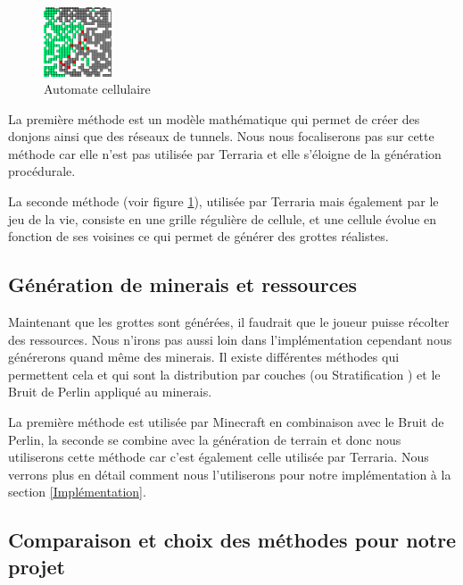 \documentclass[12pt]{article}
\begin{document}
\begin{figure}
  \centering
  \includegraphics[width=0.18\textwidth]{assets/automate_cellulaire.png}
  \caption{Automate cellulaire}
  \label{automate_cellulaire}
  \vspace{0.5cm}
\end{figure}



La première méthode est un modèle mathématique qui permet de créer des donjons ainsi que des réseaux de tunnels. Nous nous focaliserons pas sur cette méthode car elle n'est pas utilisée par Terraria et elle s'éloigne de la génération procédurale.\par 
La seconde méthode (voir figure \ref{automate_cellulaire}), utilisée par Terraria mais également par le jeu de la vie, consiste en une grille régulière de cellule, et une cellule évolue en fonction de ses voisines ce qui permet de générer des grottes réalistes.
\par
\vspace{2.5cm}
\subsection{Génération de minerais et ressources}
Maintenant que les grottes sont générées, il faudrait que le joueur puisse récolter des ressources. Nous n'irons pas aussi loin dans l'implémentation cependant nous générerons quand même des minerais. Il existe différentes méthodes qui permettent cela et qui sont la distribution par couches (ou Stratification \cite{stratification}) et le Bruit de Perlin appliqué au minerais. \par
La première méthode est utilisée par Minecraft en combinaison avec le Bruit de Perlin, la seconde se combine avec la génération de terrain et donc nous utiliserons cette méthode car c'est également celle utilisée par Terraria. Nous verrons plus en détail comment nous l'utiliserons pour notre implémentation à la section \ref{Implémentation}.
\vspace{1cm}
\subsection{Comparaison et choix des méthodes pour notre projet}
\end{document}
